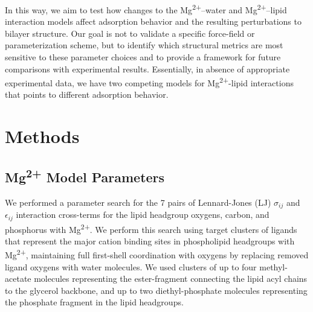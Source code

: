 \documentclass[12pt,openany,final]{book}
\newcommand{\sigmaij}{$\sigma_{ij}$}
\newcommand{\epsilonij}{$\epsilon_{ij}$}
\newcommand{\na}{Na\textsuperscript{+}}
\newcommand{\li}{Li\textsuperscript{+}}
\newcommand{\mg}{Mg\textsuperscript{2+}}
\begin{document}
In this way, we aim to test how changes to the \mg–water and \mg–lipid interaction models affect adsorption behavior and
the resulting perturbations to bilayer structure. Our goal is not to validate a specific force-field or parameterization scheme,
but to identify which structural metrics are most sensitive to these parameter choices and to provide a framework for future
comparisons with experimental results. Essentially, in absence of appropriate experimental data, we have two competing models for \mg-lipid interactions
that points to different adsorption behavior.

\section{Methods}
\subsection{\mg{} Model Parameters}

We performed a parameter search for the 7 pairs of Lennard-Jones (LJ) \sigmaij{} and \epsilonij{} interaction
cross-terms for the lipid headgroup oxygens, carbon, and phosphorus with \mg{}.
We perform this search using target
clusters of ligands that represent the major cation binding sites in phospholipid headgroups with \mg{},
maintaining full first-shell coordination with oxygens by replacing removed ligand oxygens with water molecules.
We used clusters of up to four methyl-acetate molecules representing the ester-fragment
connecting the lipid acyl chains to the glycerol backbone, and up to two diethyl-phosphate molecules representing the
phosphate fragment in the lipid headgroups.
\end{document}

